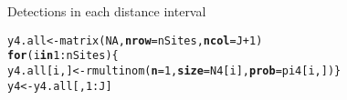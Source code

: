 \documentclass[color=usenames,dvipsnames]{beamer}\usepackage[]{graphicx}\usepackage[]{xcolor}
\makeatletter
\newcommand{\hlnum}[1]{\textcolor[rgb]{0.69,0.494,0}{#1}}%
\newcommand{\hlopt}[1]{\textcolor[rgb]{0,0,0}{#1}}%
\newcommand{\hlstd}[1]{\textcolor[rgb]{0,0,0}{#1}}%
\newcommand{\hlkwa}[1]{\textcolor[rgb]{0,0,0}{\textbf{#1}}}%
\newcommand{\hlkwb}[1]{\textcolor[rgb]{0,0.341,0.682}{#1}}%
\newcommand{\hlkwc}[1]{\textcolor[rgb]{0,0,0}{\textbf{#1}}}%
\newcommand{\hlkwd}[1]{\textcolor[rgb]{0.004,0.004,0.506}{#1}}%
\newenvironment{kframe}{%
 \def\at@end@of@kframe{}%
 \ifinner\ifhmode%
  \def\at@end@of@kframe{\end{minipage}}%
  \begin{minipage}{\columnwidth}%
 \fi\fi%
 \def\FrameCommand##1{\hskip\@totalleftmargin \hskip-\fboxsep
 \colorbox{shadecolor}{##1}\hskip-\fboxsep
     \hskip-\linewidth \hskip-\@totalleftmargin \hskip\columnwidth}%
 \MakeFramed {\advance\hsize-\width
   \@totalleftmargin\z@ \linewidth\hsize
   \@setminipage}}%
 {\par\unskip\endMakeFramed%
 \at@end@of@kframe}
\newenvironment{knitrout}{}{} %
\makeatother
\begin{document}
\begin{frame}[fragile]
  \pause
  \vfill
  Detections in each distance interval
  \vspace{-6pt}
\begin{knitrout}\scriptsize
{}\color{fgcolor}\begin{kframe}
\begin{alltt}
\hlstd{y4.all} \hlkwb{<-} \hlkwd{matrix}\hlstd{(}\hlnum{NA}\hlstd{,} \hlkwc{nrow}\hlstd{=nSites,} \hlkwc{ncol}\hlstd{=J}\hlopt{+}\hlnum{1}\hlstd{)}
\hlkwa{for}\hlstd{(i} \hlkwa{in} \hlnum{1}\hlopt{:}\hlstd{nSites) \{}
    \hlstd{y4.all[i,]} \hlkwb{<-} \hlkwd{rmultinom}\hlstd{(}\hlkwc{n}\hlstd{=}\hlnum{1}\hlstd{,} \hlkwc{size}\hlstd{=N4[i],} \hlkwc{prob}\hlstd{=pi4[i,])    \}}
\hlstd{y4} \hlkwb{<-} \hlstd{y4.all[,}\hlnum{1}\hlopt{:}\hlstd{J]}
\end{alltt}
\end{kframe}
\end{knitrout}
\end{frame}
\end{document}
